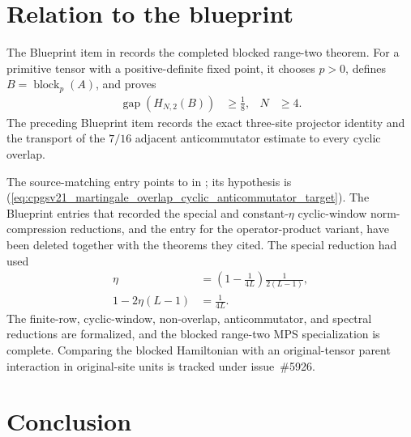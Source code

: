 \documentclass{article}
\begin{document}
\section{Relation to the blueprint}

The Blueprint item  in
records the completed blocked range-two theorem. For a primitive tensor with a
positive-definite fixed point, it chooses $p>0$, defines
$B=\operatorname{block}_p(A)$, and proves
\begin{align}
    \operatorname{gap}(H_{N,2}(B))
      & \geq\frac{1}{8},
      &
    N & \geq4.
    \label{eq:cpgsv21_martingale_overlap_blocked_range_two_gap}
\end{align}
The preceding Blueprint item records the exact three-site projector identity
and the transport of the $7/16$ adjacent anticommutator estimate to every
cyclic overlap.

The source-matching entry  points to
in ; its hypothesis
is (\ref{eq:cpgsv21_martingale_overlap_cyclic_anticommutator_target}).
The Blueprint entries that recorded the special and constant-$\eta$
cyclic-window norm-compression reductions, and the entry for the
operator-product variant, have been deleted together with the theorems they
cited. The special reduction had used
\begin{align}
    \eta
     & =
    \left(1-\frac{1}{4L}\right)\frac{1}{2(L-1)},
    \label{eq:cpgsv21_martingale_overlap_special_eta} \\
    1-2\eta(L-1)
     & =\frac{1}{4L}.
    \label{eq:cpgsv21_martingale_overlap_special_eta_gap}
\end{align}
The finite-row, cyclic-window, non-overlap, anticommutator, and spectral
reductions are formalized, and the blocked range-two MPS specialization is
complete. Comparing the blocked Hamiltonian with an original-tensor parent
interaction in original-site units is tracked under issue~\#5926.

\section{Conclusion}
\end{document}
